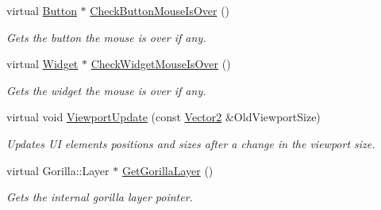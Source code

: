 \begin{DoxyCompactItemize}
virtual \hyperlink{classphys_1_1UI_1_1Button}{Button} $\ast$ \hyperlink{classphys_1_1UI_1_1Layer_a3d401a77704cba509b418c53f92cc09d}{CheckButtonMouseIsOver} ()
\begin{DoxyCompactList}\small\item\em Gets the button the mouse is over if any. \item\end{DoxyCompactList}\item 
virtual \hyperlink{classphys_1_1UI_1_1Widget}{Widget} $\ast$ \hyperlink{classphys_1_1UI_1_1Layer_ae80bef48442ac0737bfc1939fc2f9af1}{CheckWidgetMouseIsOver} ()
\begin{DoxyCompactList}\small\item\em Gets the widget the mouse is over if any. \item\end{DoxyCompactList}\item 
virtual void \hyperlink{classphys_1_1UI_1_1Layer_a832101f21d8601f296782fc24ac02705}{ViewportUpdate} (const \hyperlink{classphys_1_1Vector2}{Vector2} \&OldViewportSize)
\begin{DoxyCompactList}\small\item\em Updates UI elements positions and sizes after a change in the viewport size. \item\end{DoxyCompactList}\item 
\hypertarget{classphys_1_1UI_1_1Layer_a6528081453b4f2be4d7a4ad8878edbf0}{
virtual Gorilla::Layer $\ast$ \hyperlink{classphys_1_1UI_1_1Layer_a6528081453b4f2be4d7a4ad8878edbf0}{GetGorillaLayer} ()}
\label{classphys_1_1UI_1_1Layer_a6528081453b4f2be4d7a4ad8878edbf0}

\begin{DoxyCompactList}\small\item\em Gets the internal gorilla layer pointer. \item\end{DoxyCompactList}\end{DoxyCompactItemize}
